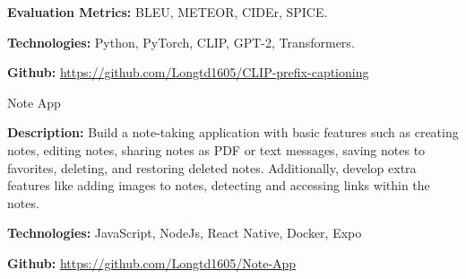 \begin{cventries}
{\begin{cvitems}
        \item {\textbf{Evaluation Metrics:} BLEU, METEOR, CIDEr, SPICE.}
        \item {\textbf{Technologies:} Python, PyTorch, CLIP, GPT-2, Transformers.}
        \item {\textbf{Github:} \href{https://github.com/Longtd1605/CLIP-prefix-captioning}{https://github.com/Longtd1605/CLIP-prefix-captioning}} %
      \end{cvitems}
      \vspace{0.7cm}
    }
  \cventryp
    {Note App} %
    {
      \begin{cvitems}
        \item {\textbf{Description:} Build a note-taking application with basic features such as creating notes, editing notes, sharing notes as PDF or text messages, saving notes to favorites, deleting, and restoring deleted notes. Additionally, develop extra features like adding images to notes, detecting and accessing links within the notes.}
        \item {\textbf{Technologies:} JavaScript, NodeJs, React Native, Docker, Expo}
        \item {\textbf{Github:} \href{https://github.com/Longtd1605/Note-App}{https://github.com/Longtd1605/Note-App}} %
      \end{cvitems}
      \vspace{0.5cm}
    }
\end{cventries}
